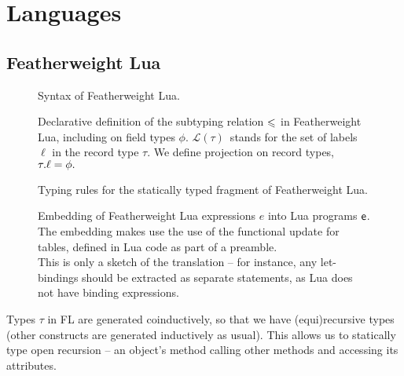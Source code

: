 \section{Languages}
\label{sec:languages}


\subsection{Featherweight Lua}
\label{subsec:featherweight-lua}

\newcommand{\erased}[1]{\textcolor{red}{#1}}

\begin{figure}
    \centering
    
    \caption{Syntax of Featherweight Lua.}
    \label{fig:featherweight-lua-grammar}
\end{figure}

\begin{figure}
    \centering
    
    \caption{Declarative definition of the subtyping relation $\leqslant$ in Featherweight Lua, including on field types $\phi$. $\mathcal L(\tau)$~stands for the set of labels $\ell$ in the record type $\tau$. We define projection on record types,~${\tau}{.}{\ell} = \phi.$}
    \label{fig:featherweight-lua-subtyping}
\end{figure}

\begin{figure}
    
    \caption{Typing rules for the statically typed fragment of Featherweight Lua.}
    \label{fig:featherweight-lua-typing}
\end{figure}

\begin{figure}
    \centering
    
    \caption{Embedding of Featherweight Lua expressions $e$ into Lua programs $\textsf{e}$. The embedding makes use the use of the functional \textsf{update} for tables, defined in Lua code as part of a preamble. \\
    This is only a sketch of the translation -- for instance, any let-bindings should be extracted as separate statements, as Lua does not have binding expressions.}
    \label{fig:featherweight-lua-embedding}
\end{figure}


Types $\tau$ in FL are generated coinductively, so that we have (equi)recursive types (other constructs are generated inductively as usual). This allows us to statically type open recursion -- an object's method calling other methods and accessing its attributes.

